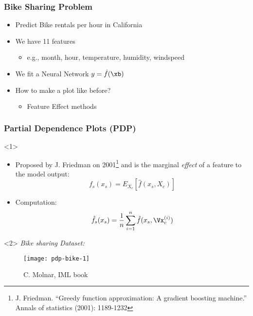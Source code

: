 \begin{frame}
  \frametitle{Bike Sharing Problem}

  \begin{itemize}
  \item Predict Bike rentals per hour in California
  \item We have 11 features
    \begin{itemize}
    \item e.g., month, hour, temperature, humidity, windspeed
    \end{itemize}
  \item We fit a Neural Network \(y = \hat{f}(\xb)\)
  \item How to make a plot like before?
    \begin{itemize}
    \item Feature Effect methods
    \end{itemize}
  \end{itemize}
\end{frame}



\begin{frame}
 \frametitle{Partial Dependence Plots (PDP)}
 \begin{onlyenv}<1>
   \begin{itemize}
   \item Proposed by J. Friedman on 2001\footnote{J. Friedman. ``Greedy
   function approximation: A gradient boosting machine.'' Annals of statistics
   (2001): 1189-1232} and is the marginal \emph{effect} of a feature to the
     model output:
     \begin{equation*}
       f_s(x_s) = E_{X_c}\left[\hat{f}(x_s, X_c)\right]
     \end{equation*}
   \item Computation:
     \begin{equation*}
       \hat{f}_s(x_s) = \frac{1}{n}\sum\limits_{i=1}^{n}\hat{f}(x_s, \Vx_c^{(i)})
     \end{equation*}
   \end{itemize}
 \end{onlyenv}
 \begin{onlyenv}<2>
   \emph{Bike sharing Dataset:}
   \begin{figure}
     \texttt{[image: pdp-bike-1]}
     \caption{\footnotesize C. Molnar, IML book}
   \end{figure}
 \end{onlyenv}
\end{frame}

